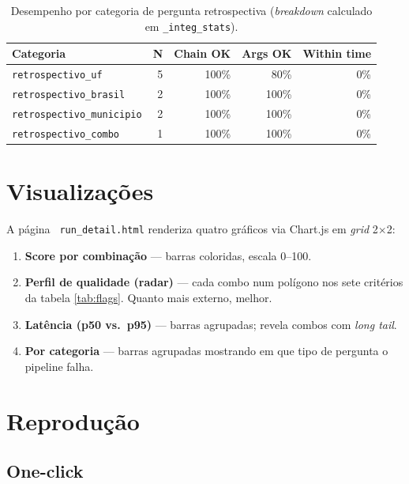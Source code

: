 \documentclass[11pt,a4paper]{article}
\newcommand{\code}[1]{\texttt{\small #1}}
\newcommand{\file}[1]{\texttt{\small\color{black!75} #1}}
\begin{document}
\begin{table}[h!]
\centering
\small
\begin{tabular}{@{}l r r r r@{}}
\toprule
\textbf{Categoria} & \textbf{N} & \textbf{Chain OK} & \textbf{Args OK} & \textbf{Within time} \\
\midrule
\code{retrospectivo\_uf}        & 5 & 100\% &  80\% & 0\% \\
\code{retrospectivo\_brasil}    & 2 & 100\% & 100\% & 0\% \\
\code{retrospectivo\_municipio} & 2 & 100\% & 100\% & 0\% \\
\code{retrospectivo\_combo}     & 1 & 100\% & 100\% & 0\% \\
\bottomrule
\end{tabular}
\caption{Desempenho por categoria de pergunta retrospectiva
(\emph{breakdown} calculado em \code{\_integ\_stats}).}
\label{tab:by-cat-result}
\end{table}

\section{Visualizações}

A página \file{run\_detail.html} renderiza quatro gráficos via Chart.js
em \emph{grid} 2$\times$2:

\begin{enumerate}[leftmargin=*]
\item \textbf{Score por combinação} --- barras coloridas, escala 0--100.
\item \textbf{Perfil de qualidade (radar)} --- cada combo num polígono
nos sete critérios da tabela \ref{tab:flags}. Quanto mais externo,
melhor.
\item \textbf{Latência (p50 vs.\ p95)} --- barras agrupadas; revela
combos com \emph{long tail}.
\item \textbf{Por categoria} --- barras agrupadas mostrando em que tipo
de pergunta o pipeline falha.
\end{enumerate}

\section{Reprodução}

\subsection{One-click}
\end{document}
